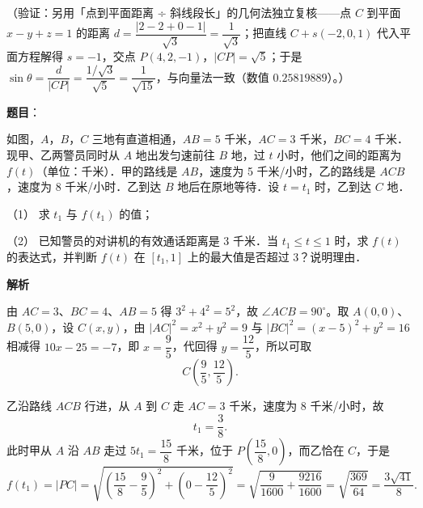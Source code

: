 \begin{answer}
（验证：另用「点到平面距离 ÷ 斜线段长」的几何法独立复核——点 \(C\) 到平面 \(x-y+z=1\) 的距离 \(d=\dfrac{\left|2-2+0-1\right|}{\sqrt{3}}=\dfrac{1}{\sqrt{3}}\)；把直线 \(C+s(-2,0,1)\) 代入平面方程解得 \(s=-1\)，交点 \(P(4,2,-1)\)，\(\left|CP\right|=\sqrt{5}\)；于是 \(\sin\theta=\dfrac{d}{\left|CP\right|}=\dfrac{1/\sqrt{3}}{\sqrt{5}}=\dfrac{1}{\sqrt{15}}\)，与向量法一致（数值 \(0.25819889\)）。）


\end{answer}
\begin{answer}

\textbf{题目}：

如图，\(A\)，\(B\)，\(C\) 三地有直道相通，\(AB=5\) 千米，\(AC=3\) 千米，\(BC=4\) 千米．现甲、乙两警员同时从 \(A\) 地出发匀速前往 \(B\) 地，过 \(t\) 小时，他们之间的距离为 \(f(t)\)（单位：千米）．甲的路线是 \(AB\)，速度为 5 千米/小时，乙的路线是 \(ACB\)，速度为 8 千米/小时．乙到达 \(B\) 地后在原地等待．设 \(t=t_{1}\) 时，乙到达 \(C\) 地．

（1） 求 \(t_{1}\) 与 \(f(t_{1})\) 的值；

（2） 已知警员的对讲机的有效通话距离是 3 千米．当 \(t_{1}\leqslant t\leqslant 1\) 时，求 \(f(t)\) 的表达式，并判断 \(f(t)\) 在 \([t_{1},1]\) 上的最大值是否超过 3？说明理由．
\nopagebreak[4]
\begin{center}\end{center}
\nopagebreak[4]
\textbf{解析}

由 \(AC=3\)、\(BC=4\)、\(AB=5\) 得 \(3^{2}+4^{2}=5^{2}\)，故 \(\angle ACB=90^{\circ}\)。取 \(A(0,0)\)、\(B(5,0)\)，设 \(C(x,y)\)，由 \(\left|AC\right|^{2}=x^{2}+y^{2}=9\) 与 \(\left|BC\right|^{2}=(x-5)^{2}+y^{2}=16\) 相减得 \(10x-25=-7\)，即 \(x=\dfrac{9}{5}\)，代回得 \(y=\dfrac{12}{5}\)，所以可取
\nopagebreak[4]
\[
C\left(\frac{9}{5},\frac{12}{5}\right).
\]


乙沿路线 \(ACB\) 行进，从 \(A\) 到 \(C\) 走 \(AC=3\) 千米，速度为 \(8\) 千米/小时，故
\nopagebreak[4]
\[
t_{1}=\frac{3}{8}.
\]
此时甲从 \(A\) 沿 \(AB\) 走过 \(5t_{1}=\dfrac{15}{8}\) 千米，位于 \(P\left(\dfrac{15}{8},0\right)\)，而乙恰在 \(C\)，于是
\nopagebreak[4]
\[
f(t_{1})=\left|PC\right|=\sqrt{\left(\frac{15}{8}-\frac{9}{5}\right)^{2}+\left(0-\frac{12}{5}\right)^{2}}=\sqrt{\frac{9}{1600}+\frac{9216}{1600}}=\sqrt{\frac{369}{64}}=\frac{3\sqrt{41}}{8}.
\]


\end{answer}
